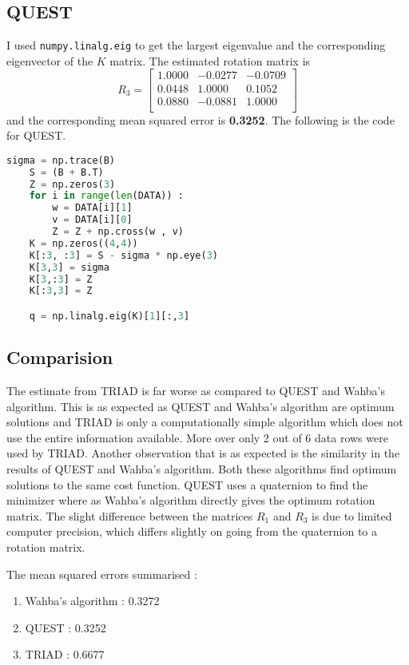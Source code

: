 \documentclass[11pt]{article}
\begin{document}
\subsection*{QUEST}
I used \texttt{numpy.linalg.eig} to get the largest eigenvalue and the corresponding eigenvector of the 
$K$ matrix. 
The estimated rotation matrix is 
\begin{equation*}
    R_3 = \begin{bmatrix}
        1.0000 & -0.0277 & -0.0709 \\ 
        0.0448 & 1.0000 & 0.1052 \\ 
        0.0880 & -0.0881 & 1.0000 \\ 
    \end{bmatrix}
\end{equation*}
and the corresponding mean squared error is \textbf{0.3252}.
The following is the code for QUEST.
\begin{lstlisting}[language=python]
    sigma = np.trace(B)
    S = (B + B.T)
    Z = np.zeros(3)
    for i in range(len(DATA)) :
        w = DATA[i][1]
        v = DATA[i][0]
        Z = Z + np.cross(w , v)
    K = np.zeros((4,4))
    K[:3, :3] = S - sigma * np.eye(3)
    K[3,3] = sigma
    K[3,:3] = Z
    K[:3,3] = Z

    q = np.linalg.eig(K)[1][:,3]
\end{lstlisting}
\subsection*{Comparision}
The estimate from TRIAD is far worse as compared to QUEST and Wahba's algorithm. This is as expected 
as QUEST and Wahba's algorithm are optimum solutions and TRIAD is only a computationally simple algorithm which does not use the entire information available. More over only 2 out of 6 
data rows were used by TRIAD. 
Another observation that is as expected is the similarity in the results of QUEST and Wahba's algorithm. Both these algorithms find 
optimum solutions to the same cost function. QUEST uses a quaternion to find the minimizer where as Wahba's algorithm 
directly gives the optimum rotation matrix. The slight difference between the matrices $R_1$ and $R_3$ is due to limited computer precision, which 
differs slightly on going from the quaternion to a rotation matrix. 
\vspace{2mm}

The mean squared errors summarised :
\begin{enumerate}
    \item Wahba's algorithm : 0.3272
    \item QUEST : 0.3252
    \item TRIAD : 0.6677 
\end{enumerate}
\end{document}

